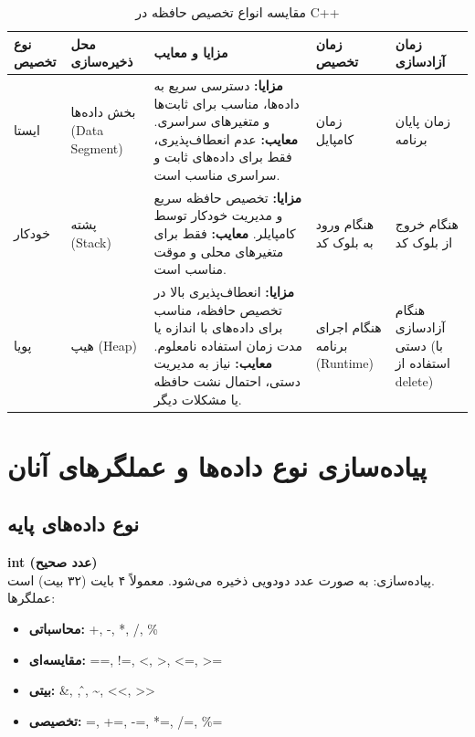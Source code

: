 \documentclass[12pt, a4paper]{report}
\begin{document}
\begin{table}[H]
	\centering
	\begin{tabular}{|p{3cm}|p{3cm}|p{3.5cm}|p{3cm}|p{3cm}|}
		\hline
		\textbf{نوع تخصیص} & \textbf{محل ذخیره‌سازی} & \textbf{مزایا و معایب} & \textbf{زمان تخصیص} & \textbf{زمان آزادسازی} \\
		\hline
		ایستا &
		بخش داده‌ها (Data Segment) &
		\textbf{مزایا:} دسترسی سریع به داده‌ها، مناسب برای ثابت‌ها و متغیرهای سراسری. \newline
		\textbf{معایب:} عدم انعطاف‌پذیری، فقط برای داده‌های ثابت و سراسری مناسب است. &
		زمان کامپایل &
		زمان پایان برنامه \\
		\hline
		خودکار &
		پشته (Stack) &
		\textbf{مزایا:} تخصیص حافظه سریع و مدیریت خودکار توسط کامپایلر. \newline
		\textbf{معایب:} فقط برای متغیرهای محلی و موقت مناسب است. &
		هنگام ورود به بلوک کد &
		هنگام خروج از بلوک کد \\
		\hline
		پویا &
		هیپ (Heap) &
		\textbf{مزایا:} انعطاف‌پذیری بالا در تخصیص حافظه، مناسب برای داده‌های با اندازه یا مدت زمان استفاده نامعلوم. \newline
		\textbf{معایب:} نیاز به مدیریت دستی، احتمال نشت حافظه یا مشکلات دیگر. &
		هنگام اجرای برنامه (Runtime) &
		هنگام آزادسازی دستی (با استفاده از delete) \\
		\hline
	\end{tabular}
	\caption{مقایسه انواع تخصیص حافظه در C++}
	\label{tab:memory_allocation}
\end{table}


\section{پیاده‌سازی نوع داده‌ها و عملگرهای آنان}

\subsection{نوع داده‌های پایه}

\textbf{int (عدد صحیح)} \\
پیاده‌سازی: به صورت عدد دودویی ذخیره می‌شود. معمولاً ۴ بایت (۳۲ بیت) است. \\
عملگرها:
\begin{itemize}
	\item \textbf{محاسباتی:} +, -, *, /, \%
	\item \textbf{مقایسه‌ای:} ==, !=, <, >, <=, >=
	\item \textbf{بیتی:} \&, \textbar, \^, \~{}, \textless\textless, \textgreater\textgreater
	\item \textbf{تخصیصی:} =, +=, -=, *=, /=, \%=
	
\end{itemize}
\end{document}

